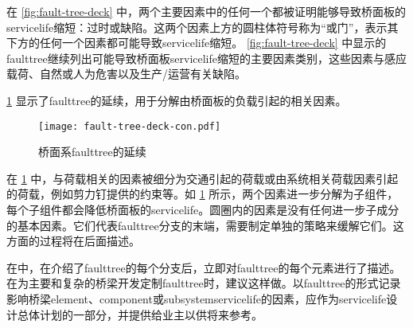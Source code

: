 在 \cref{fig:fault-tree-deck} 中，两个主要因素中的任何一个都被证明能够导致桥面板的\gls*{servicelife}缩短：过时或缺陷。这两个因素上方的圆柱体符号称为“或门”，表示其下方的任何一个因素都可能导致\gls{servicelife}缩短。 \cref{fig:fault-tree-deck} 中显示的\gls*{faulttree}继续列出可能导致桥面板\gls{servicelife}缩短的主要因素类别，这些因素与感应载荷、自然或人为危害以及生产/运营有关缺陷。

\cref{fig:fault-tree-deck-con} 显示了\gls*{faulttree}的延续，用于分解由桥面板的负载引起的相关因素。

\begin{figure}
  \texttt{[image: fault-tree-deck-con.pdf]}
  \caption{桥面系\gls*{faulttree}的延续}\label{fig:fault-tree-deck-con}
\end{figure}


在 \cref{fig:fault-tree-deck-con} 中，与荷载相关的因素被细分为交通引起的荷载或由系统相关荷载因素引起的荷载，例如剪力钉提供的约束等。如 \cref{fig:fault-tree-deck-con} 所示，两个因素进一步分解为子组件，每个子组件都会降低桥面板的\gls{servicelife}。圆圈内的因素是没有任何进一步子成分的基本因素。它们代表\gls*{faulttree}分支的末端，需要制定单独的策略来缓解它们。这方面的过程将在后面描述。


在中，在介绍了\gls*{faulttree}的每个分支后，立即对\gls*{faulttree}的每个元素进行了描述。在为主要和复杂的桥梁开发定制\gls*{faulttree}时，建议这样做。以\gls*{faulttree}的形式记录影响桥梁\gls{element}、\gls{component}或\gls{subsystem}\gls{servicelife}的因素，应作为\gls{servicelife}设计总体计划的一部分，并提供给业主以供将来参考。

